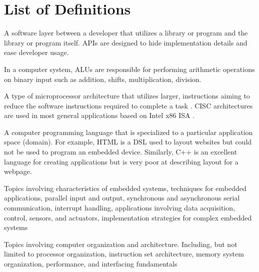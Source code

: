 
\chapter*{List of Definitions}

\begin{definition}
    A software layer between a developer that utilizes a library or program and the library or program itself. APIs are designed to hide implementation details and ease developer usage.
\end{definition}

\begin{definition}
In a computer system, ALUs are responsible for performing arithmetic operations on binary input such as addition, shifts, multiplication, division.
\end{definition}

\begin{definition}
A type of microprocessor architecture that utilizes larger, instructions aiming to reduce the software instructions required to complete a task \cite{Aletan1992, Stokes1999}. CISC architectures are used in most general applications based on Intel\textregistered{} x86 ISA \cite{intel2017}.
\end{definition}

\begin{definition}
    A computer programming language that is specialized to a particular application space (domain). For example, HTML is a DSL used to layout websites but could not be used to program an embedded device. Similarly, C++ is an excellent language for creating applications but is very poor at describing layout for a webpage.
\end{definition}

\begin{definition} 
	Topics involving characteristics of embedded systems, techniques for embedded applications, parallel input and output, synchronous and asynchronous serial communication, interrupt handling, applications involving data acquisition, control, sensors, and actuators, implementation strategies for complex embedded systems \cite[p.~118]{cec2016}
\end{definition}

\begin{definition} 
	Topics involving computer organization and architecture. Including, but not limited to processor organization, instruction set architecture, memory system organization, performance, and interfacing fundamentals \cite[p.~118]{cec2016}
\end{definition}

